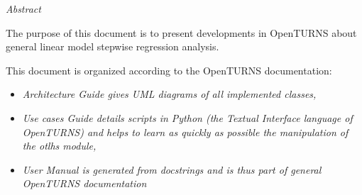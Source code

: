 %

\vspace{0.5in}
\begin{center}
\vspace{0.3in}
\emph{ Abstract}
\vspace{0.5in}
\end{center}

The purpose of this document is to present developments in OpenTURNS about general linear model stepwise regression analysis.

This document is organized according to the OpenTURNS documentation:
\begin{itemize}
\item \itshape{Architecture Guide} gives UML diagrams of all implemented classes,
\item \itshape{Use cases Guide} details scripts in Python (the Textual Interface language of OpenTURNS) and helps to learn as quickly as possible the manipulation of the \textit{otlhs} module,
\item \itshape{User Manual} is generated from docstrings and is thus part of general OpenTURNS documentation
\end{itemize}

